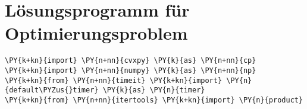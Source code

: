 \section{Lösungsprogramm für Optimierungsproblem}


\renewcommand{\encodingdefault}{OT1}
\renewcommand{\rmdefault}{cmr}
\renewcommand{\sfdefault}{cmss}
\renewcommand{\ttdefault}{cmtt}
\selectfont
\fontsize{10.95}{13.6}\selectfont
\linespread{0.9}\selectfont

\begin{tcolorbox}[breakable, size=fbox, boxrule=1pt, pad at break*=1mm,colback=cellbackground, colframe=cellborder]
    \begin{Verbatim}[commandchars=\\\{\}]
\PY{k+kn}{import} \PY{n+nn}{cvxpy} \PY{k}{as} \PY{n+nn}{cp}
\PY{k+kn}{import} \PY{n+nn}{numpy} \PY{k}{as} \PY{n+nn}{np}
\PY{k+kn}{from} \PY{n+nn}{timeit} \PY{k+kn}{import} \PY{n}{default\PYZus{}timer} \PY{k}{as} \PY{n}{timer}
\PY{k+kn}{from} \PY{n+nn}{itertools} \PY{k+kn}{import} \PY{n}{product}
    \end{Verbatim}
\end{tcolorbox}

